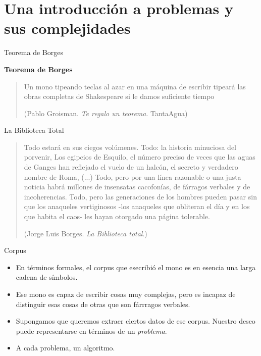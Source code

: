 \documentclass{beamer}
\begin{document}
\section{Una introducción a problemas y sus complejidades}
\begin{frame}{Teorema de Borges}

\textbf{Teorema de Borges}

\begin{quote}
Un mono tipeando teclas al azar en una máquina de escribir tipeará las obras completas de Shakespeare si le damos suficiente tiempo
\begin{flushright}
(Pablo Groisman. \textit{Te regalo un teorema}. TantaAgua)
\end{flushright}
\end{quote}
\end{frame}

\begin{frame}{La Biblioteca Total}
\begin{quote}
Todo estará en sus ciegos volúmenes. Todo: la historia minuciosa del porvenir, Los egipcios de Esquilo, el número preciso de veces que las aguas de Ganges han reflejado el vuelo de un halcón, el secreto y verdadero nombre de Roma, (...) Todo, pero por una línea razonable o una justa noticia habrá millones de insensatas cacofonías, de fárragos verbales y de incoherencias. Todo, pero las generaciones de los hombres pueden pasar sin que los anaqueles vertiginosos -los anaqueles que obliteran el día y en los que habita el caos- les hayan otorgado una página tolerable. 
\begin{flushright}
(Jorge Luis Borges. \textit{La Biblioteca total}.)
\end{flushright}
\end{quote}
\end{frame}

\begin{frame}{Corpus}
\begin{itemize}
\item En términos formales, el corpus que esecribió el mono es en esencia una larga cadena de símbolos.
\item Ese mono es capaz de escribir cosas muy complejas, pero es incapaz de distinguir esas cosas de otras que son fárrragos verbales.
\end{itemize}
\end{frame}

\begin{frame}
\begin{itemize}
\item Supongamos que queremos extraer ciertos datos de ese corpus. Nuestro deseo puede representarse en términos de un \textit{problema}.
\pause
\item A cada problema, un algoritmo.
\end{itemize}
\end{frame}
\end{document}
